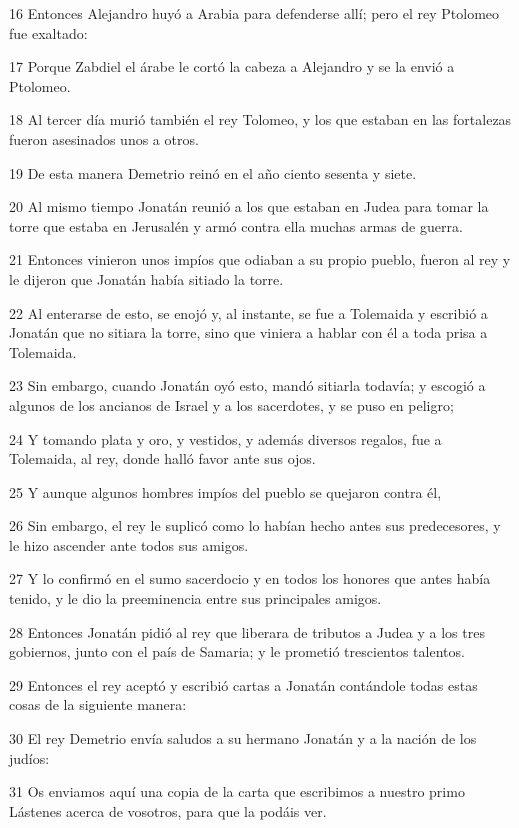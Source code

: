\par 16 Entonces Alejandro huyó a Arabia para defenderse allí; pero el rey Ptolomeo fue exaltado:
\par 17 Porque Zabdiel el árabe le cortó la cabeza a Alejandro y se la envió a Ptolomeo.
\par 18 Al tercer día murió también el rey Tolomeo, y los que estaban en las fortalezas fueron asesinados unos a otros.
\par 19 De esta manera Demetrio reinó en el año ciento sesenta y siete.
\par 20 Al mismo tiempo Jonatán reunió a los que estaban en Judea para tomar la torre que estaba en Jerusalén y armó contra ella muchas armas de guerra.
\par 21 Entonces vinieron unos impíos que odiaban a su propio pueblo, fueron al rey y le dijeron que Jonatán había sitiado la torre.
\par 22 Al enterarse de esto, se enojó y, al instante, se fue a Tolemaida y escribió a Jonatán que no sitiara la torre, sino que viniera a hablar con él a toda prisa a Tolemaida.
\par 23 Sin embargo, cuando Jonatán oyó esto, mandó sitiarla todavía; y escogió a algunos de los ancianos de Israel y a los sacerdotes, y se puso en peligro;
\par 24 Y tomando plata y oro, y vestidos, y además diversos regalos, fue a Tolemaida, al rey, donde halló favor ante sus ojos.
\par 25 Y aunque algunos hombres impíos del pueblo se quejaron contra él,
\par 26 Sin embargo, el rey le suplicó como lo habían hecho antes sus predecesores, y le hizo ascender ante todos sus amigos.
\par 27 Y lo confirmó en el sumo sacerdocio y en todos los honores que antes había tenido, y le dio la preeminencia entre sus principales amigos.
\par 28 Entonces Jonatán pidió al rey que liberara de tributos a Judea y a los tres gobiernos, junto con el país de Samaria; y le prometió trescientos talentos.
\par 29 Entonces el rey aceptó y escribió cartas a Jonatán contándole todas estas cosas de la siguiente manera:
\par 30 El rey Demetrio envía saludos a su hermano Jonatán y a la nación de los judíos:
\par 31 Os enviamos aquí una copia de la carta que escribimos a nuestro primo Lástenes acerca de vosotros, para que la podáis ver.

